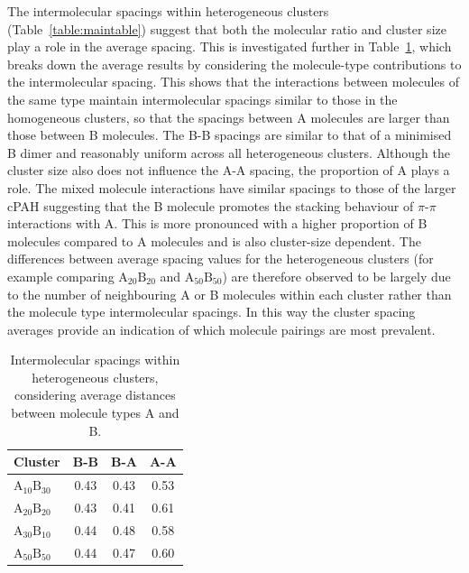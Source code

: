 The intermolecular spacings within heterogeneous clusters (Table~\ref{table:maintable}) suggest that both the molecular ratio and cluster size play a role in the average spacing. This is investigated further in Table~\ref{table:mixedintermolecdists}, which breaks down the average results by considering the molecule-type contributions to the intermolecular spacing. This shows that the interactions between molecules of the same type maintain intermolecular spacings similar to those in the homogeneous clusters, so that the spacings between A molecules are larger than those between B molecules. The B-B spacings are similar to that of a minimised B dimer and reasonably uniform across all heterogeneous clusters.  %
Although the cluster size also does not influence the A-A spacing, the proportion of A plays a role. The mixed molecule interactions have similar spacings to those of the larger cPAH suggesting that the B molecule promotes the stacking behaviour of $\pi$-$\pi$ interactions with A. This is more pronounced with a higher proportion of B molecules compared to A molecules and is also cluster-size dependent. The differences between average spacing values for the heterogeneous clusters (for example comparing $\text{A}_{\text{20}}\text{B}_{\text{20}}$ and $\text{A}_{\text{50}}\text{B}_{\text{50}}$) are therefore observed to be largely due to the number of neighbouring A or B molecules within each cluster rather than the molecule type intermolecular spacings. %
In this way the cluster spacing averages provide an indication of which molecule pairings are most prevalent. %
%
\begin{table}[thb]
\centering
\caption{Intermolecular spacings within heterogeneous clusters, considering average distances between molecule types A and B.}
\label{table:mixedintermolecdists}
\begin{tabular}{lccc}
\hline
Cluster & B-B & B-A & A-A \\ \hline
$\text{A}_{\text{10}}\text{B}_{\text{30}}$ & 0.43 & 0.43 & 0.53 \\
$\text{A}_{\text{20}}\text{B}_{\text{20}}$ & 0.43 & 0.41 & 0.61 \\
$\text{A}_{\text{30}}\text{B}_{\text{10}}$ & 0.44 & 0.48 & 0.58 \\
$\text{A}_{\text{50}}\text{B}_{\text{50}}$ & 0.44 & 0.47 & 0.60 \\
\hline
\end{tabular}
\end{table}
%

